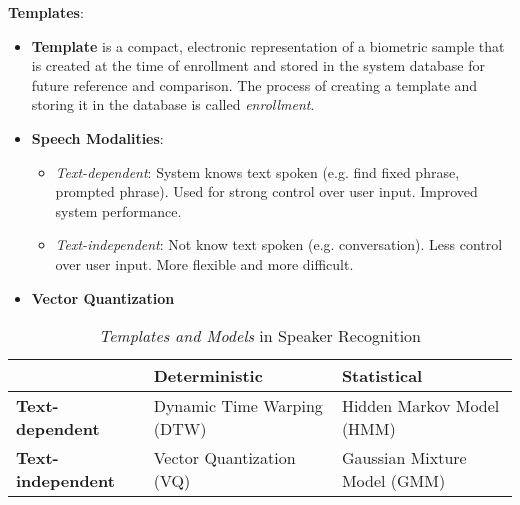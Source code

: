 \documentclass[a4paper]{article}
\begin{document}
      \textbf{Templates}:
      \begin{itemize}
        \item \textbf{Template} is a compact, electronic representation of a biometric sample that is created at the time of enrollment and stored in the system database for future reference and comparison. The process of creating a template and storing it in the database is called \emph{enrollment}.
        \item \textbf{Speech Modalities}:
        \begin{itemize}
          \item \emph{Text-dependent}: System knows text spoken (e.g. find fixed phrase, prompted phrase). Used for strong control over user input. Improved system performance.
          \item \emph{Text-independent}: Not know text spoken (e.g. conversation). Less control over user input. More flexible and more difficult.
        \end{itemize}
        \item \textbf{Vector Quantization} 
      \end{itemize}

        \begin{table}[htp]
          \centering
          \begin{tabular}{lll}
          \toprule
          & \textbf{Deterministic}    & \textbf{Statistical}   \\
          \midrule
          \textbf{Text-dependent}       & Dynamic Time Warping (DTW) & Hidden Markov Model (HMM)      \\
          \textbf{Text-independent}     & Vector Quantization (VQ)   & Gaussian Mixture Model (GMM)   \\
          \bottomrule
          \end{tabular}
          \caption{\emph{Templates and Models} in Speaker Recognition}
          \label{tab:spk}
        \end{table}
\end{document}

